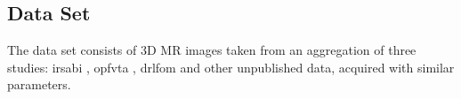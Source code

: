 %
%
%
%

\subsection{Data Set} \label{subsec:Data Set}
The data set consists of 3D MR images taken from an aggregation of three studies: irsabi \cite{irsabi_bidsdata}, opfvta \cite{ioanas_whole-brain_nodate}, drlfom \cite{ioanas_effects_nodate} and other unpublished data, acquired with similar parameters.

